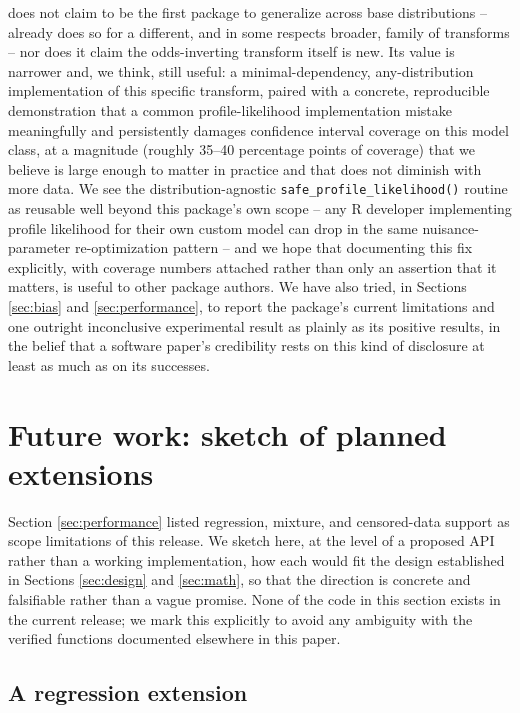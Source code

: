  does not claim to be the first package to
generalize across base distributions --  already does so
for a different, and in some respects broader, family of transforms --
nor does it claim the odds-inverting transform itself is new. Its value
is narrower and, we think, still useful: a minimal-dependency,
any-distribution implementation of this specific transform, paired with
a concrete, reproducible demonstration that a common profile-likelihood
implementation mistake meaningfully and persistently damages confidence
interval coverage on this model class, at a magnitude (roughly 35--40
percentage points of coverage) that we believe is large enough to matter
in practice and that does not diminish with more data. We see the
distribution-agnostic \texttt{safe\_profile\_likelihood()} routine as
reusable well beyond this package's own scope -- any R developer
implementing profile likelihood for their own custom model can drop in
the same nuisance-parameter re-optimization pattern -- and we hope that
documenting this fix explicitly, with coverage numbers attached rather
than only an assertion that it matters, is useful to other package
authors. We have also tried, in Sections \ref{sec:bias} and
\ref{sec:performance}, to report the package's current limitations and
one outright inconclusive experimental result as plainly as its
positive results, in the belief that a software paper's credibility
rests on this kind of disclosure at least as much as on its successes.

\section{Future work: sketch of planned extensions}
\label{sec:futurework}

Section \ref{sec:performance} listed regression, mixture, and
censored-data support as scope limitations of this release. We sketch
here, at the level of a proposed API rather than a working
implementation, how each would fit the design established in Sections
\ref{sec:design} and \ref{sec:math}, so that the direction is concrete
and falsifiable rather than a vague promise. None of the code in this
section exists in the current release; we mark this explicitly to
avoid any ambiguity with the verified functions documented elsewhere in
this paper.

\subsection{A regression extension}

